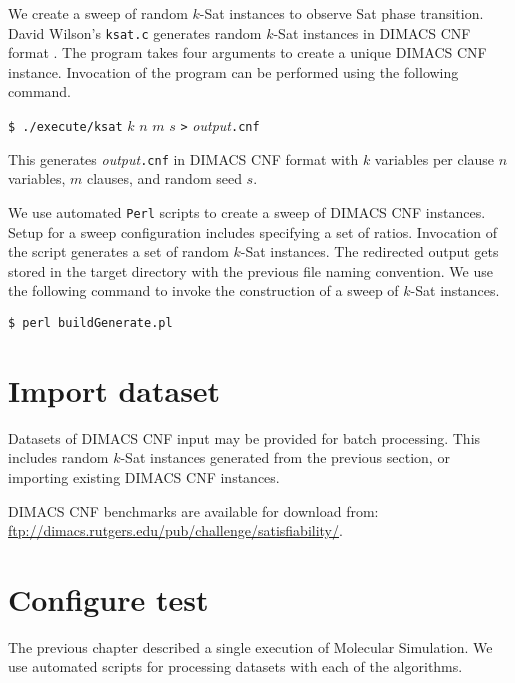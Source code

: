 
We create a sweep of random $k$-{\sc Sat} instances to observe {\sc Sat} phase transition.  David Wilson's \texttt{ksat.c} generates random $k$-{\sc Sat} instances in DIMACS CNF format \cite{wilsonKsat}.  The program takes four arguments to create a unique DIMACS CNF instance.  Invocation of the program can be performed using the following command.

\begin{center}
\texttt{\$ ./execute/ksat} $k$ $n$ $m$ $s$ \texttt{>} \textit{output}\texttt{.cnf}
\end{center}

This generates \textit{output}\texttt{.cnf} in DIMACS CNF format with $k$ variables per clause $n$ variables, $m$ clauses, and random seed $s$.

We use automated \texttt{Perl} scripts to create a sweep of DIMACS CNF instances.  Setup for a sweep configuration includes specifying a set of ratios.  Invocation of the script generates a set of random $k$-{\sc Sat} instances.  The redirected output gets stored in the target directory with the previous file naming convention.  We use the following command to invoke the construction of a sweep of $k$-{\sc Sat} instances.

\begin{center}
\texttt{\$ perl buildGenerate.pl}
\end{center}

	\section{Import dataset}

Datasets of DIMACS CNF input may be provided for batch processing.  This includes random $k$-{\sc Sat} instances generated from the previous section, or importing existing DIMACS CNF instances.   


DIMACS CNF benchmarks are available for download from: \url{ftp://dimacs.rutgers.edu/pub/challenge/satisfiability/}.

	\section{Configure test}
The previous chapter described a single execution of Molecular Simulation.  We use automated scripts for processing datasets with each of the algorithms.

